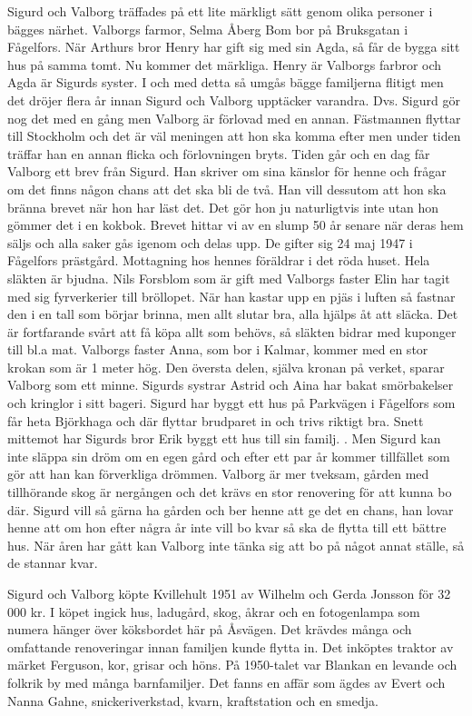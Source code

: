 Sigurd och Valborg träffades på ett lite märkligt sätt genom olika personer i bägges närhet. 
Valborgs farmor, Selma Åberg Bom bor på Bruksgatan i Fågelfors. När Arthurs bror Henry har gift sig med sin Agda, så får de bygga sitt hus på samma tomt. 
Nu kommer det märkliga. Henry är Valborgs farbror och Agda är Sigurds syster. I och med detta så umgås bägge familjerna flitigt men det dröjer flera år innan Sigurd och Valborg upptäcker varandra. 
Dvs. Sigurd gör nog det med en gång men Valborg är förlovad med en annan. Fästmannen flyttar till Stockholm och det är väl meningen att hon ska komma efter men under tiden träffar han en annan flicka och förlovningen bryts.
Tiden går och en dag får Valborg ett brev från Sigurd. Han skriver om sina känslor för henne och frågar om det finns någon chans att det ska bli de två. Han vill dessutom att hon ska bränna brevet när hon har läst det. Det gör hon ju naturligtvis inte utan hon gömmer det i en kokbok. Brevet hittar vi av en slump 50 år senare när deras hem säljs och alla saker gås igenom och delas upp.
De gifter sig 24 maj 1947 i Fågelfors prästgård. Mottagning hos hennes föräldrar i det röda huset. Hela släkten är bjudna. Nils Forsblom som är gift med Valborgs faster Elin har tagit med sig fyrverkerier till bröllopet. När han kastar upp en pjäs i luften så fastnar den i en tall som börjar brinna, men allt slutar bra, alla hjälps åt att släcka. 
Det är fortfarande svårt att få köpa allt som behövs, så släkten bidrar med kuponger till bl.a mat. Valborgs faster Anna, som bor i Kalmar, kommer med en stor krokan som är 1 meter hög. Den översta delen, själva kronan på verket, sparar Valborg som ett minne. Sigurds systrar Astrid och Aina har bakat smörbakelser och kringlor i sitt bageri.
Sigurd har byggt ett hus på Parkvägen i Fågelfors som får heta Björkhaga och där flyttar brudparet in och trivs riktigt bra. Snett mittemot har Sigurds bror Erik byggt ett  hus till sin familj.  .
Men Sigurd kan inte släppa sin dröm om en egen gård och efter ett par år kommer tillfället som gör att han kan förverkliga drömmen. Valborg är mer tveksam, gården med tillhörande skog är nergången och det krävs en stor renovering för att kunna bo där. Sigurd vill så gärna ha gården och ber henne att ge det en chans, han lovar henne att om hon efter några år inte vill bo kvar så ska de flytta till ett bättre hus. När åren har gått kan Valborg inte tänka sig att bo på något annat ställe, så de stannar kvar.

Sigurd och Valborg köpte Kvillehult 1951 av Wilhelm och Gerda Jonsson för 32 000 kr. I köpet ingick hus, ladugård, skog, åkrar och en fotogenlampa som numera hänger över köksbordet här på Åsvägen. Det krävdes många och omfattande renoveringar innan familjen kunde flytta in. Det inköptes traktor av märket Ferguson, kor, grisar och höns. 
På 1950-talet var Blankan en levande och folkrik by med många  barnfamiljer. Det fanns en affär som ägdes av Evert och Nanna Gahne, snickeriverkstad, kvarn, kraftstation och en smedja. 